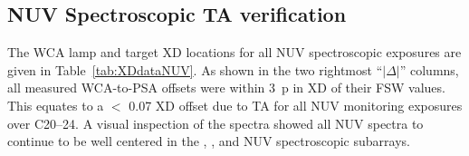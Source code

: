 \subsection{NUV Spectroscopic TA verification}\label{subsec:NspVER}
The \plamptwo{} WCA lamp and target XD locations for all NUV spectroscopic exposures are given in Table~\ref{tab:XDdataNUV}.
As shown in the two rightmost ``$|\Delta|$'' columns, all measured WCA-to-PSA offsets were within 3~p in XD of their FSW values. This equates to a $<$ 0.07\arcsec{} XD offset due to TA
for all NUV monitoring exposures over C20--24.
A visual inspection of the spectra showed all NUV spectra to continue to be well centered in the , , and  NUV spectroscopic subarrays.

